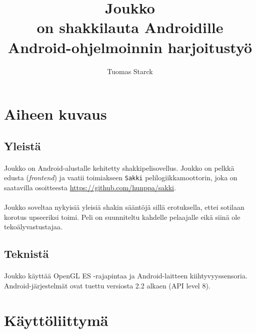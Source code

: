 \documentclass[11pt]{article}
\begin{document}
\title{
\Huge{\bf Joukko} \\
\Large{on shakkilauta Androidille} \\
\large{Android-ohjelmoinnin harjoitustyö}}
\author{Tuomas Starck}
\maketitle

\vspace{4em}

\section{Aiheen kuvaus}
\label{sec:aihe}

\subsection{Yleistä}

\paragraph{} Joukko on Android-alustalle kehitetty shakkipelisovellus. Joukko on pelkkä edusta (\textit{frontend}) ja vaatii toimiakseen \texttt{Sakki} pelilogiikkamoottorin, joka on saatavilla osoitteesta \url{https://github.com/hunppa/sakki}.

\paragraph{} Joukko soveltaa nykyisiä yleisiä shakin sääntöjä sillä erotuksella, ettei sotilaan korotus upseeriksi toimi. Peli on suunniteltu kahdelle pelaajalle eikä siinä ole tekoälyvastustajaa.

\subsection{Teknistä}

\paragraph{} Joukko käyttää OpenGL ES -rajapintaa ja Android-laitteen kiihtyvyyssensoria. Android-järjestelmät ovat tuettu versiosta 2.2 alkaen (API level 8).

\section{Käyttöliittymä}
\end{document}
